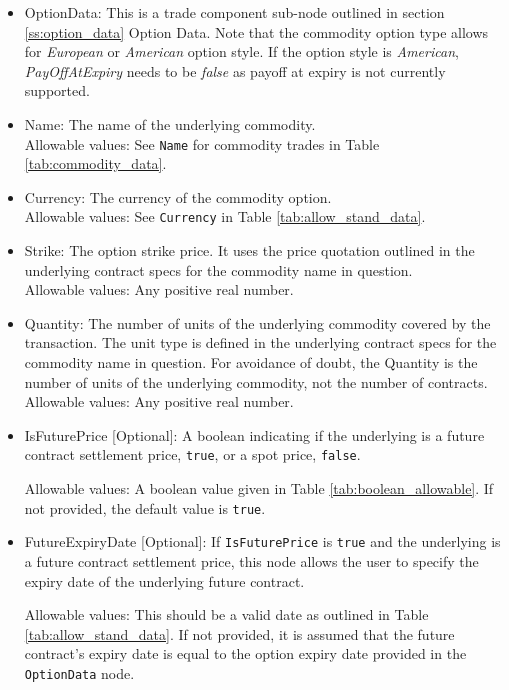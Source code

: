 \begin{itemize}

\item OptionData: This is a trade component sub-node outlined in section \ref{ss:option_data} Option Data. Note that the commodity option type allows for \emph{European} or \emph{American} option style. If the option style is \emph{American}, \emph{PayOffAtExpiry} needs to be \emph{false} as payoff at expiry is not currently supported.
\item Name: The name of the underlying commodity. \\
Allowable values: See \lstinline!Name! for commodity trades in Table \ref{tab:commodity_data}.
\item Currency: The currency of the commodity option. \\
Allowable values: See \lstinline!Currency! in Table \ref{tab:allow_stand_data}.
\item Strike: The option strike price. It uses the price quotation outlined in the underlying contract specs for the commodity name in question.  \\
Allowable values: Any positive real number.
\item Quantity: The number of units of the underlying commodity covered by the transaction. The unit type is defined in the underlying contract specs for the commodity name in question. For avoidance of doubt, the Quantity is the number of units of the underlying commodity, not the number of contracts. \\
Allowable values: Any positive real number.

\item IsFuturePrice [Optional]: A boolean indicating if the underlying is a future contract settlement price, \lstinline!true!, or a spot price, \lstinline!false!.

Allowable values: A boolean value given in Table \ref{tab:boolean_allowable}. If not provided, the default value is \lstinline!true!.

\item FutureExpiryDate [Optional]: If \lstinline!IsFuturePrice! is \lstinline!true! and the underlying is a future contract settlement price, this node allows the user to specify the expiry date of the underlying future contract.

Allowable values: This should be a valid date as outlined in Table \ref{tab:allow_stand_data}. If not provided, it is assumed that the future contract's expiry date is equal to the option expiry date provided in the \lstinline!OptionData! node.
\end{itemize}

